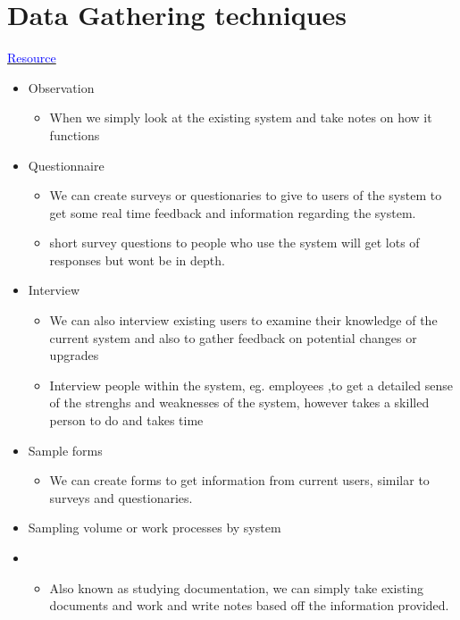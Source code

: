 \documentclass[12pt, a4, twoside]{article}
\begin{document}
  \section{Data Gathering techniques}
  
  \href{https://www.bzfar.org/publ/sdlc/stages_of_sdlc/data_collection_methods/47-1-0-56}{\textcolor{Blue}{Resource}}
  \begin{itemize}
    \item Observation
    \begin{itemize}
      \item When we simply look at the existing system and take notes on how it functions
    \end{itemize}
    \item Questionnaire
    \begin{itemize}
      \item We can create surveys or questionaries to give to users of the system to get some real time feedback and information regarding the system.
      \item short survey questions to people who use the system will get lots of responses but wont be in depth.
    \end{itemize}
    \item Interview
    \begin{itemize}
      \item We can also interview existing users to examine their knowledge of the current system and also to gather feedback on potential changes or upgrades
      \item Interview people within the system, eg. employees ,to get a detailed sense of the strenghs and weaknesses of the system, however takes a skilled person to do and takes time
    \end{itemize}
    \item Sample forms
    \begin{itemize}
      \item We can create forms to get information from current users, similar to surveys and questionaries.
    \end{itemize}
    \item Sampling volume or work processes by system
    \item \begin{itemize}
      \item Also known as studying documentation, we can simply take existing documents and work and write notes based off the information provided.
    \end{itemize}

\end{itemize}
\end{document}
